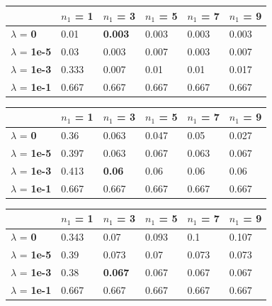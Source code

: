 \documentclass[10pt]{article}
\begin{document}
\begin{table}
\centering
\begin{tabular}{llllll}
\toprule
& $n_1$ = \bf{1} & $n_1$ =  \bf{3} & $n_1$ =  \bf{5} & $n_1$ =  \bf{7} & $n_1$ =  \bf{9} \\
\midrule
$\lambda$ = \bf{0} &        0.01  & \bf{0.003} & 0.003 & 0.003 & 0.003 \\
$\lambda$ = \bf{1e-5} &    0.03  & 0.003 & 0.007 & 0.003 & 0.007 \\
$\lambda$ = \bf{1e-3} &    0.333 & 0.007 & 0.01  & 0.01  & 0.017 \\
$\lambda$ = \bf{1e-1} &    0.667 & 0.667 & 0.667 & 0.667 & 0.667 \\
\bottomrule
\end{tabular}
\end{table}


\begin{table}
\centering
\begin{tabular}{llllll}
\toprule
& $n_1$ = \bf{1} & $n_1$ =  \bf{3} & $n_1$ =  \bf{5} & $n_1$ =  \bf{7} & $n_1$ =  \bf{9} \\
\midrule
$\lambda$ = \bf{0} &  0.36  & 0.063 & 0.047 & 0.05  & 0.027 \\
$\lambda$ = \bf{1e-5} & 0.397 & 0.063 & 0.067 & 0.063 & 0.067 \\
$\lambda$ = \bf{1e-3} & 0.413 & \bf{0.06}  & 0.06  & 0.06  & 0.06  \\
$\lambda$ = \bf{1e-1} & 0.667 & 0.667 & 0.667 & 0.667 & 0.667 \\
\bottomrule
\end{tabular}
\end{table}

\begin{table}
\centering
\begin{tabular}{llllll}
\toprule
& $n_1$ = \bf{1} & $n_1$ =  \bf{3} & $n_1$ =  \bf{5} & $n_1$ =  \bf{7} & $n_1$ =  \bf{9} \\
\midrule
$\lambda$ = \bf{0} &      0.343 & 0.07  & 0.093 & 0.1   & 0.107 \\
$\lambda$ = \bf{1e-5} &   0.39  & 0.073 & 0.07  & 0.073 & 0.073 \\
$\lambda$ = \bf{1e-3} &  0.38  & \bf{0.067} & 0.067 & 0.067 & 0.067 \\
$\lambda$ = \bf{1e-1} &  0.667 & 0.667 & 0.667 & 0.667 & 0.667 \\
\bottomrule
\end{tabular}
\end{table}
\end{document}
